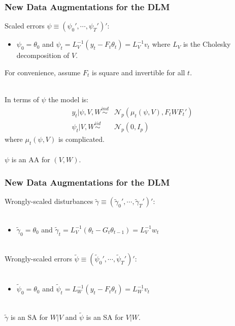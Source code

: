 \documentclass[xcolor=dvipsnames]{beamer}
\newcommand\N{\mathcal{N}}
\begin{document}
\begin{frame}
\frametitle{New Data Augmentations for the DLM}
Scaled errors $\psi\equiv(\psi_0',\cdots,\psi_T')'$:
\begin{itemize}
\item[]$\psi_0=\theta_0$ and $\psi_t=L_V^{-1}(y_t - F_t\theta_t)=L_V^{-1}v_t$ where $L_V$ is the Cholesky decomposition of $V$.
\end{itemize}
For convenience, assume $F_t$ is square and invertible for all $t$.\\~
 
In terms of $\psi$ the model is:
\begin{align*}
y_t|\psi,V,W \stackrel{ind}{\sim} &\N_p(\mu_t(\psi,V),F_tWF_t')\\
\psi_t|V,W \stackrel{iid}{\sim} &\N_p(0,I_p)
\end{align*} 
where $\mu_t(\psi,V)$ is complicated.\\~\\

{\color{blue}$\psi$ is an AA for $(V,W)$.}
\end{frame}

\begin{frame}
\frametitle{New Data Augmentations for the DLM}
Wrongly-scaled disturbances $\tilde{\gamma}\equiv(\tilde{\gamma}_0',\cdots,\tilde{\gamma}_T')'$:\\~\\
\begin{itemize}
\item[]$\tilde{\gamma}_0=\theta_0$ and $\tilde{\gamma}_t=L_V^{-1}(\theta_t - G_t\theta_{t-1})=L_V^{-1}w_t$\\~\\
\end{itemize}

Wrongly-scaled errors $\tilde{\psi}\equiv(\tilde{\psi}_0',\cdots,\tilde{\psi}_T')'$:\\~\\
\begin{itemize}
\item[]$\tilde{\psi}_0=\theta_0$ and $\tilde{\psi}_t=L_W^{-1}(y_t - F_t\theta_{t})=L_W^{-1}v_t$\\~\\
\end{itemize}

{\color{blue} $\tilde{\gamma}$ is an SA for $W|V$ and $\tilde{\psi}$ is an SA for $V|W$.}
\end{frame}
\end{document}
